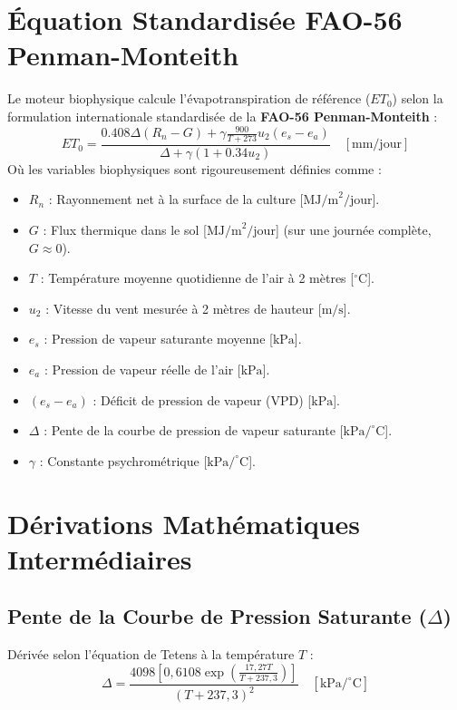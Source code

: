 \documentclass[11pt,a4paper,oneside]{report}
\begin{document}
\section{Équation Standardisée FAO-56 Penman-Monteith}
Le moteur biophysique calcule l'évapotranspiration de référence ($ET_0$) selon la formulation internationale standardisée de la \textbf{FAO-56 Penman-Monteith} :
\begin{equation}
ET_0 = \frac{0.408 \Delta (R_n - G) + \gamma \frac{900}{T + 273} u_2 (e_s - e_a)}{\Delta + \gamma (1 + 0.34 u_2)} \quad [\text{mm/jour}]
\label{eq:fao56_fr}
\end{equation}
Où les variables biophysiques sont rigoureusement définies comme :
\begin{itemize}[leftmargin=*]
    \item $R_n$ : Rayonnement net à la surface de la culture [$\text{MJ/m}^2/\text{jour}$].
    \item $G$ : Flux thermique dans le sol [$\text{MJ/m}^2/\text{jour}$] (sur une journée complète, $G \approx 0$).
    \item $T$ : Température moyenne quotidienne de l'air à 2 mètres [$^\circ\text{C}$].
    \item $u_2$ : Vitesse du vent mesurée à 2 mètres de hauteur [$\text{m/s}$].
    \item $e_s$ : Pression de vapeur saturante moyenne [$\text{kPa}$].
    \item $e_a$ : Pression de vapeur réelle de l'air [$\text{kPa}$].
    \item $(e_s - e_a)$ : Déficit de pression de vapeur (VPD) [$\text{kPa}$].
    \item $\Delta$ : Pente de la courbe de pression de vapeur saturante [$\text{kPa/}^\circ\text{C}$].
    \item $\gamma$ : Constante psychrométrique [$\text{kPa/}^\circ\text{C}$].
\end{itemize}

\section{Dérivations Mathématiques Intermédiaires}
\subsection{Pente de la Courbe de Pression Saturante ($\Delta$)}
Dérivée selon l'équation de Tetens à la température $T$ :
\begin{equation}
\Delta = \frac{4098 \left[ 0,6108 \exp\left( \frac{17,27 T}{T + 237,3} \right) \right]}{(T + 237,3)^2} \quad [\text{kPa/}^\circ\text{C}]
\end{equation}
\end{document}
